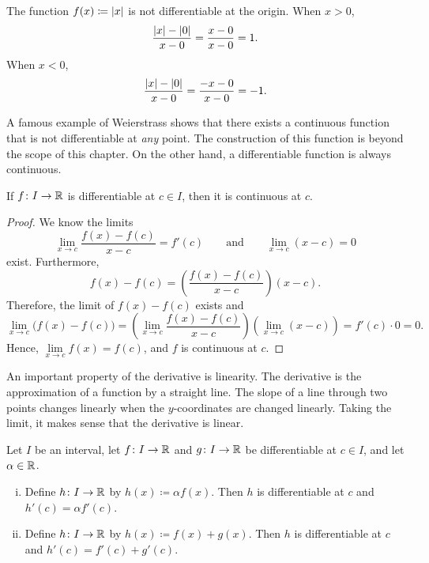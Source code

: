 \begin{example}
The function $f(x) \coloneqq \lvert {x} \rvert$ is not differentiable
at the origin.  When $x > 0$,
\begin{equation*}
\frac{\lvert {x} \rvert-\lvert {0} \rvert}{x-0} =
\frac{x-0}{x-0} = 1 .
\end{equation*}
When $x < 0$,
\begin{equation*}
\frac{\lvert {x} \rvert-\lvert {0} \rvert}{x-0} =
\frac{-x-0}{x-0} = -1 .
\end{equation*}
\end{example}

A famous example of Weierstrass shows that there exists a continuous
function that is not differentiable at \emph{any} point.  The construction
of this function is beyond the scope of this chapter.  On the other hand,
a differentiable function is always continuous.

\begin{prop}
If $f \colon I \to {\mathbb{R}}$ is differentiable at $c \in I$,
then it is continuous at $c$.
\end{prop}

\begin{proof}
We know the limits
\begin{equation*}
\lim_{x\to c}\frac{f(x)-f(c)}{x-c} = f'(c)
\qquad
\text{and}
\qquad
\lim_{x\to c}(x-c) = 0
\end{equation*}
exist.  Furthermore,
\begin{equation*}
f(x)-f(c) = 
\left( \frac{f(x)-f(c)}{x-c} \right) (x-c) .
\end{equation*}
Therefore, the limit of $f(x)-f(c)$ exists and
\begin{equation*}
\lim_{x\to c} \bigl( f(x)-f(c) \bigr) =
\left(\lim_{x\to c} \frac{f(x)-f(c)}{x-c} \right)
\left(\lim_{x\to c} (x-c) \right) =
f'(c) \cdot 0  = 0.
\end{equation*}
Hence, $\lim\limits_{x\to c} f(x) = f(c)$, and $f$ is continuous at $c$.
\end{proof}

An important property of the derivative is linearity.  The
derivative is the approximation of a function by a straight line.
The slope of a line through two points changes linearly when the
$y$-coordinates are changed linearly.  Taking the limit,
it makes sense that the derivative is linear.

\begin{prop}[Linearity]
Let $I$ be an interval, let
$f \colon I \to {\mathbb{R}}$ and $g \colon I \to {\mathbb{R}}$ be differentiable at $c \in I$,
and let $\alpha \in {\mathbb{R}}$.
\begin{enumerate}[(i)]
\item
Define $h \colon I \to {\mathbb{R}}$ by $h(x) \coloneqq \alpha f(x)$.  Then
$h$ is differentiable at $c$ and
$h'(c) = \alpha f'(c)$.
\item
Define $h \colon I \to {\mathbb{R}}$ by $h(x) \coloneqq  f(x) + g(x)$.  Then
$h$ is differentiable at $c$ and
$h'(c) =  f'(c) + g'(c)$.
\end{enumerate}
\end{prop}

